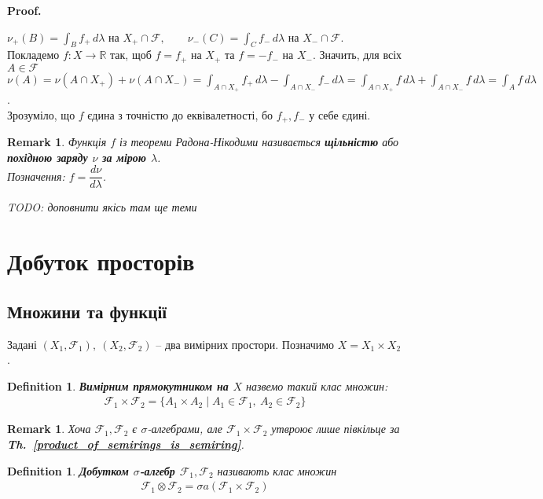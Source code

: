 \documentclass[a4paper, 10pt]{article}
\makeatletter
\theoremstyle{theoremdd}
\newtheorem{definition}[theorem]{Definition}
\newtheorem{remark}[theorem]{Remark}
\newcommand\thref[1]{\textbf{Th.~\ref{#1}}}
\renewenvironment{proof}[1][Proof.\\]{\par
\pushQED{\hfill \qed}%
\normalfont \topsep6\p@\@plus6\p@\relax
\trivlist
\item\relax
{\bfseries
#1\@addpunct{.}}\hspace\labelsep\ignorespaces
}{%
\popQED\endtrivlist\@endpefalse
}
\makeatother
\begin{document}
\begin{proof}
$\nu_+(B) = \displaystyle\int_B f_+\,d\lambda \text{ на } X_+ \cap \mathcal{F}, \qquad \nu_-(C) = \displaystyle\int_C f_-\,d\lambda \text{ на } X_- \cap \mathcal{F}$.\\
Покладемо $f \colon X \to \mathbb{R}$ так, щоб $f = f_+$ на $X_+$ та $f = -f_-$ на $X_-$. Значить, для всіх $A \in \mathcal{F}$\\
$\nu(A) = \nu(A \cap X_+) + \nu(A \cap X_-) = \displaystyle\int_{A \cap X_+} f_+\,d\lambda - \int_{A \cap X_-}f_-\,d\lambda = \int_{A \cap X_+} f\,d\lambda + \int_{A \cap X_-}f\,d\lambda = \int_A f\,d\lambda$.\\
Зрозуміло, що $f$ єдина з точністю до еквівалетності, бо $f_+,f_-$ у себе єдині. 
\end{proof}

\begin{remark}
Функція $f$ із теореми Радона-Нікодими називається \textbf{щільністю} або \textbf{похідною заряду $\nu$ за мірою $\lambda$}.\\
Позначення: $f = \dfrac{d\nu}{d\lambda}$.
\end{remark}

\textit{TODO: доповнити якісь там ще теми}
\newpage

\section{Добуток просторів}
\subsection{Множини та функції}
Задані $(X_1,\mathcal{F}_1),\ (X_2,\mathcal{F}_2)$ -- два вимірних простори. Позначимо $X = X_1 \times X_2$.

\begin{definition}
\textbf{Вимірним прямокутником на $X$} назвемо такий клас множин:
\begin{align*}
\mathcal{F}_1 \times \mathcal{F}_2 = \{ A_1 \times A_2 \mid A_1 \in \mathcal{F}_1,\ A_2 \in \mathcal{F}_2 \}
\end{align*}
\end{definition}

\begin{remark}
Хоча $\mathcal{F}_1,\mathcal{F}_2$ є $\sigma$-алгебрами, але $\mathcal{F}_1 \times \mathcal{F}_2$ утвроює лише півкільце за \thref{product_of_semirings_is_semiring}.
\end{remark}

\begin{definition}
\textbf{Добутком $\sigma$-алгебр $\mathcal{F}_1,\mathcal{F}_2$} називають клас множин
\begin{align*}
\mathcal{F}_1 \otimes \mathcal{F}_2 = \sigma a(\mathcal{F}_1 \times \mathcal{F}_2)
\end{align*}
\end{definition}
\end{document}
